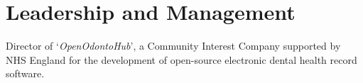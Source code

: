 \section*{Leadership and Management}

 Director of `\textit{OpenOdontoHub}', a Community Interest Company supported by NHS England for the development of open-source electronic dental health record software.
